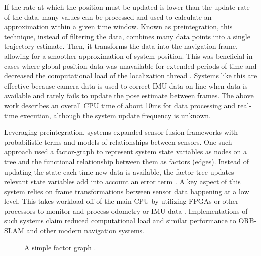 \documentclass{article}
\begin{document}
        If the rate at which the position must be updated is lower than the update rate of the data, many values can be processed and used to calculate an approximation within a given time window. Known as preintegration, this technique, instead of filtering the data, combines many data points into a single trajectory estimate. Then, it transforms the data into the navigation frame, allowing for a smoother approximation of system position. This was beneficial in cases where global position data was unavailable for extended periods of time and decreased the computational load of the localization thread \cite{lupton_vian_2012}. Systems like this are effective because camera data is used to correct IMU data on-line when data is available and rarely fails to update the pose estimate between frames. The above work describes an overall CPU time of about 10ms for data processing and real-time execution, although the system update frequency is unknown.

        Leveraging preintegration, systems expanded sensor fusion frameworks with probabilistic terms and models of relationships between sensors. One such approach used a factor-graph to represent system state variables as nodes on a tree and the functional relationship between them as factors (edges). Instead of updating the state each time new data is available, the factor tree updates relevant state variables add into account an error term \cite{indelman_ifns_2013}. A key aspect of this system relies on frame transformations between sensor data happening at a low level. This takes workload off of the main CPU by utilizing FPGAs or other processors to monitor and process odometry or IMU data \cite{li_gyro_2017}. Implementations of such systems claim reduced computational load and similar performance to ORB-SLAM and other modern navigation systems.

    \begin{figure}[H]
      \centering
      \label{fig:ex_factor_graph}
      \caption{A simple factor graph \cite{hwymeers_example}.}
    \end{figure}
\end{document}
